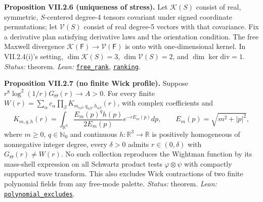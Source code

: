 \documentclass[
  letterpaper,
  11pt]{article}
\begin{document}
\textbf{Proposition VII.2.6 (uniqueness of stress).} Let
\(\mathcal K(S)\) consist of real, symmetric, \(S\)-centered degree-4
tensors covariant under signed coordinate permutations; let
\(\mathcal V(S)\) consist of real degree-5 vectors with that covariance.
Fix a derivative plan satisfying derivative laws and the orientation
condition. The free Maxwell divergence
\(\mathcal K(\mathsf F)\to\mathcal V(\mathsf F)\) is onto with
one-dimensional kernel. In VII.2.4(i)'s setting,
\(\dim\mathcal K(S)=3\), \(\dim\mathcal V(S)=2\), and
\(\dim\ker\mathrm{div}=1\). \emph{Status:} theorem. \emph{Lean:}
\href{https://github.com/yang-mills-group/OpenAI-YM-20261028/blob/3456e5e75cf8d4cd558955a5c7638fba2d68f464/YM/Further/PHYSICAL_PERIOD_LIMIT_F933/FreeRanks.lean\#L159-L165}{\texttt{free\_rank}},
\href{https://github.com/yang-mills-group/OpenAI-YM-20261028/blob/3456e5e75cf8d4cd558955a5c7638fba2d68f464/YM/TraceExtension/Chart/Masts.lean\#L41-L51}{\texttt{ranking}}.

\textbf{Proposition VII.2.7 (no finite Wick profile).} Suppose
\(r^8\log^2(1/r)G_\Theta(r)\to A>0\). For every finite
\(W(r)=\sum_\alpha c_\alpha\prod_\beta K_{m_{\alpha\beta},q_{\alpha\beta},h_{\alpha\beta}}(r)\),
with complex coefficients and
\[K_{m,q,h}(r)=\int_{\mathbb R^3}\frac{E_m(p)^qh(p)}{2E_m(p)}e^{-rE_m(p)}dp,\qquad E_m(p)=\sqrt{m^2+|p|^2},\]
where \(m\ge0\), \(q\in\mathbb N_0\) and continuous
\(h:\mathbb R^3\to\mathbb R\) is positively homogeneous of nonnegative
integer degree, every \(\delta>0\) admits \(r\in(0,\delta)\) with
\(G_\Theta(r)\ne W(r)\). No such collection reproduces the Wightman
function by its mass-shell expression on all Schwartz product tests
\(\varphi\otimes\psi\) with compactly supported wave transform. This
also excludes Wick contractions of two finite polynomial fields from any
free-mode palette. \emph{Status:} theorem. \emph{Lean:}
\href{https://github.com/yang-mills-group/OpenAI-YM-20261028/blob/3456e5e75cf8d4cd558955a5c7638fba2d68f464/YM/TraceExtension/Wick/Refute.lean\#L86-L105}{\texttt{polynomial\_excludes}}.
\end{document}
